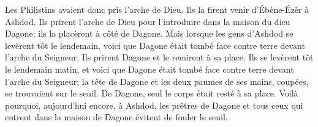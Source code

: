 Les Philistins avaient donc pris l’arche de Dieu.
	Ils la firent venir d’Ébène-Ézèr à Ashdod.
Ils prirent l’arche de Dieu pour l’introduire dans la maison du dieu Dagone;
	ils la placèrent à côté de Dagone.
Mais lorsque les gens d’Ashdod se levèrent tôt le lendemain,
	voici que Dagone était tombé face contre terre devant l’arche du Seigneur.
	Ils prirent Dagone et le remirent à sa place.
Ils se levèrent tôt le lendemain matin,
	et voici que Dagone était tombé face contre terre devant l’arche du Seigneur;
	la tête de Dagone et les deux paumes de ses mains, coupées,
		se trouvaient sur le seuil.
	De Dagone, seul le corps était resté à sa place.
Voilà pourquoi, aujourd’hui encore, à Ashdod,
	les prêtres de Dagone et tous ceux qui entrent dans la maison de Dagone
		évitent de fouler le seuil.
